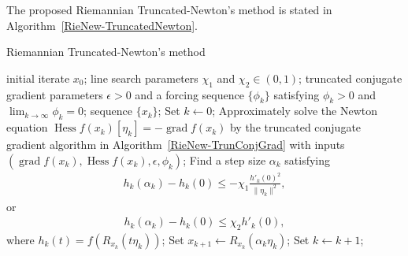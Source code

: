 \documentclass[11pt]{article}
\newcommand{\zwhcomm}[2]{{\sf\color{purple} #1}{\sf\color{blue} #2}}
\numberwithin{equation}{section}
\DeclareMathOperator{\Hess}{\mathrm{Hess}}
\DeclareMathOperator{\grad}{\mathrm{grad}}
\begin{document}
The proposed Riemannian Truncated-Newton's method is stated in Algorithm~\ref{RieNew-TruncatedNewton}.

\begin{algorithm}[htbp]
  \caption{Riemannian Truncated-Newton's method} 
  \begin{algorithmic}[1] \label{RieNew-TruncatedNewton}
  \REQUIRE initial iterate $x_0$; line search parameters $\chi_1$ and $\chi_2\in(0,1)$; truncated conjugate gradient parameters $\epsilon>0$ and a forcing sequence $\{\phi_k\}$ satisfying $\phi_k>0$ and $\lim_{k\rightarrow \infty}\phi_k=0$; %
  \ENSURE sequence $\{x_k\}$; %
  \STATE Set $k\gets0$;
  \STATE \label{RieNew:st01} Approximately solve the Newton equation $\Hess f(x_k) [\eta_k] = - \grad f(x_k)$ by the truncated conjugate gradient algorithm in Algorithm~\ref{RieNew-TrunConjGrad} with inputs $(\grad f(x_k), \Hess f(x_k), \epsilon, \phi_k)$;
  \STATE \label{RieNew:st02} Find a step size $\alpha_k$ satisfying %
  \begin{equation}
  \begin{aligned}
    \label{RieNew-BrydCond1}
      h_k(\alpha_k)-h_k(0)\le -\chi_1 \frac{h'_k(0)^2}{\|\eta_k\|^2}, 
  \end{aligned}
  \end{equation}
  or 
  \begin{equation}
    \begin{aligned}
      \label{RieNew-BrydCond2}
      h_k(\alpha_k)- h_k(0) \le \chi_2 h'_k(0), 
    \end{aligned}
  \end{equation}
  where %
  $h_k(t)=f(R_{x_k}(t\eta_k))$;
  \STATE \label{RieNew:st03} Set $x_{k+1} \gets R_{x_k}(\alpha_k\eta_k)$;
  \STATE \label{RieNew:st04} Set $k\gets k+1$;
  \ENDWHILE
  
 \end{algorithmic}
\end{algorithm}
\end{document}
